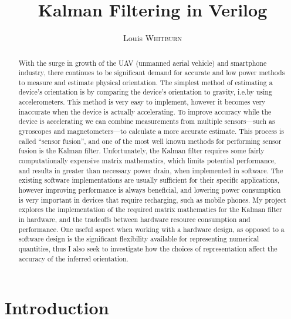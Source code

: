 \documentclass[12pt]{article}
\title{Kalman Filtering in Verilog}
\author{Louis \textsc{Whitburn}}
\begin{document}
\maketitle

\begin{abstract}

With the surge in growth of the UAV (unmanned aerial vehicle) and smartphone industry, there continues to be significant demand for accurate and low power methods to measure and estimate physical orientation. The simplest method of estimating a device's orientation is by comparing the device's orientation to gravity, i.e.\@ by using accelerometers. This method is very easy to implement, however it becomes very inaccurate when the device is actually accelerating. To improve accuracy while the device is accelerating we can combine measurements from multiple sensors---such as gyroscopes and magnetometers---to calculate a more accurate estimate. This process is called ``sensor fusion'', and one of the most well known methods for performing sensor fusion is the Kalman filter. Unfortunately, the Kalman filter requires some fairly computationally expensive matrix mathematics, which limits potential performance, and results in greater than necessary power drain, when implemented in software. The existing software implementations are usually sufficient for their specific applications, however improving performance is always beneficial, and lowering power consumption is very important in devices that require recharging, such as mobile phones. My project explores the implementation of the required matrix mathematics for the Kalman filter in hardware, and the tradeoffs between hardware resource consumption and performance. One useful aspect when working with a hardware design, as opposed to a software design is the significant flexibility available for representing numerical quantities, thus I also seek to investigate how the choices of representation affect the accuracy of the inferred orientation.

\end{abstract}

\section{Introduction}
\end{document}
